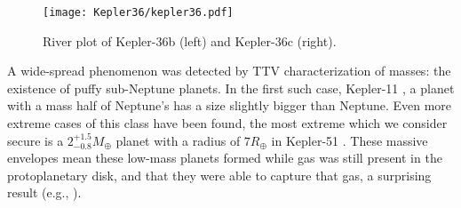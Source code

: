 \documentclass[graybox,natbib,nosecnum]{svmult}
\begin{document}
\begin{figure}
\centerline{
\texttt{[image: Kepler36/kepler36.pdf]}}
\caption{River plot of Kepler-36b (left) and Kepler-36c (right).}
\label{fig:kep36}
\end{figure}


A wide-spread phenomenon was detected by TTV characterization of masses: the existence of puffy sub-Neptune planets.  In the first such case, Kepler-11 \citep{2011Natur.470...53L}, a planet with a mass half of Neptune's has a size slightly bigger than Neptune.  Even more extreme cases of this class have been found, the most extreme which we consider secure is a $2^{+1.5}_{-0.8} M_\oplus$ planet with a radius of $7 R_\oplus$ in Kepler-51 \citep{2014ApJ...783...53M}.  These massive envelopes mean these low-mass planets formed while gas was still present in the protoplanetary disk, and that they were able to capture that gas, a surprising result (e.g., \citep{2016ApJ...817...90L,2016ApJ...825...29G}). 
 
\end{document}
